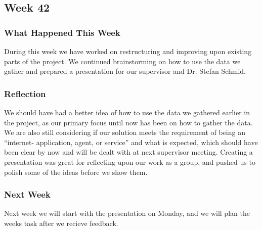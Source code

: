 \subsection{Week 42}
\subsubsection{What Happened This Week} 
During this week we have worked on restructuring and improving upon existing
parts of the project. We continued brainstorming on how to use the data we
gather and prepared a presentation for our supervisor and Dr. Stefan Schmid.

\subsubsection{Reflection}
We should have had a better idea of how to use the data we gathered earlier in
the project, as our primary focus until now has been on how to gather the data.
We are also still considering if our solution meets the requirement of being an
``internet- application, agent, or service'' and what is expected, which should
have been clear by now and will be dealt with at next supervisor meeting.
Creating a presentation was great for reflecting upon our work as a group, and
pushed us to polish some of the ideas before we show them.

\subsubsection{Next Week}
Next week we will start with the presentation on Monday, and we will plan the
weeks task after we recieve feedback.



